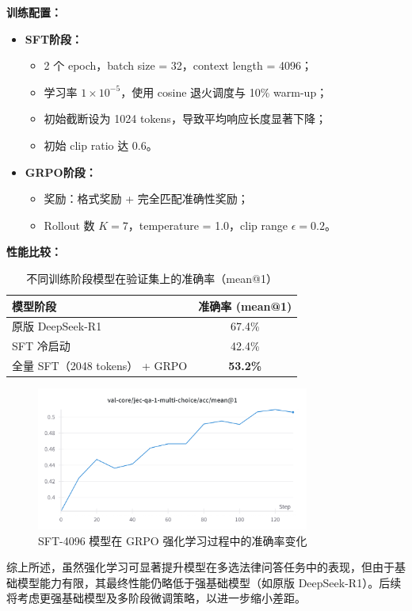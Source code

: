 \documentclass{pkuthesis}
\begin{document}
\textbf{训练配置：}
\begin{itemize}
  \item \textbf{SFT阶段：}
    \begin{itemize}
      \item 2 个 epoch，batch size = 32，context length = 4096；
      \item 学习率 $1\times10^{-5}$，使用 cosine 退火调度与 10\% warm-up；
      \item 初始截断设为 1024 tokens，导致平均响应长度显著下降；
      \item 初始 clip ratio 达 0.6。
    \end{itemize}
  \item \textbf{GRPO阶段：}
    \begin{itemize}
      \item 奖励：格式奖励 + 完全匹配准确性奖励；
      \item Rollout 数 $K=7$，temperature = 1.0，clip range $\epsilon = 0.2$。
    \end{itemize}
\end{itemize}

\textbf{性能比较：}

\begin{table}[h]
  \centering
  \caption{不同训练阶段模型在验证集上的准确率（mean@1）}
  \label{tab:acc-distill-sft-grpo}
  \begin{tabular}{l|c}
    \hline
    模型阶段 & 准确率 (mean@1) \\
    \hline
    原版 DeepSeek-R1 & 67.4\% \\
    SFT 冷启动 & 42.4\% \\
    全量 SFT（2048 tokens） + GRPO & \textbf{53.2\%} \\
    \hline
  \end{tabular}
\end{table}

\begin{figure}[h]
  \centering
  \includegraphics[width=0.8\textwidth]{figures/sft4096.png}
  \caption{SFT-4096 模型在 GRPO 强化学习过程中的准确率变化}
  \label{fig:acc-comparison}
\end{figure}

综上所述，虽然强化学习可显著提升模型在多选法律问答任务中的表现，但由于基础模型能力有限，其最终性能仍略低于强基础模型（如原版 DeepSeek-R1）。后续将考虑更强基础模型及多阶段微调策略，以进一步缩小差距。



\printbibliography
\end{document}

